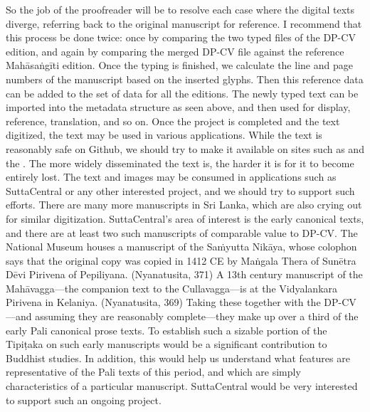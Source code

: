 {}So the job of the proofreader will be to resolve each case where the digital texts diverge, referring back to the original manuscript for reference.\markdownRendererInterblockSeparator
{}I recommend that this process be done twice: once by comparing the two typed files of the DP-CV edition, and again by comparing the merged DP-CV file against the reference Mahāsaṅgīti edition.\markdownRendererInterblockSeparator
{}Once the typing is finished, we calculate the line and page numbers of the manuscript based on the inserted glyphs. Then this reference data can be added to the set of data for all the editions. The newly typed text can be imported into the metadata structure as seen above, and then used for display, reference, translation, and so on.\markdownRendererInterblockSeparator
{}\markdownRendererInterblockSeparator
{}Once the project is completed and the text digitized, the text may be used in various applications. While the text is reasonably safe on Github, we should try to make it available on sites such as  and the . The more widely disseminated the text is, the harder it is for it to become entirely lost.\markdownRendererInterblockSeparator
{}The text and images may be consumed in applications such as SuttaCentral or any other interested project, and we should try to support such efforts.\markdownRendererInterblockSeparator
{}There are many more manuscripts in Sri Lanka, which are also crying out for similar digitization. SuttaCentral’s area of interest is the early canonical texts, and there are at least two such manuscripts of comparable value to DP-CV.\markdownRendererInterblockSeparator
{}\markdownRendererUlBegin
\markdownRendererUlItem The National Museum houses a manuscript of the Saṁyutta Nikāya, whose colophon says that the original copy was copied in 1412 CE by Maṅgala Thera of Sunētra Dēvi Pirivena of Pepiliyana. (Nyanatusita, 371)\markdownRendererUlItemEnd 
\markdownRendererUlItem A 13th century manuscript of the Mahāvagga—the companion text to the Cullavagga—is at the Vidyalankara Pirivena in Kelaniya. (Nyanatusita, 369)\markdownRendererUlItemEnd 
\markdownRendererUlEnd \markdownRendererInterblockSeparator
{}Taking these together with the DP-CV—and assuming they are reasonably complete—they make up over a third of the early Pali canonical prose texts. To establish such a sizable portion of the Tipiṭaka on such early manuscripts would be a significant contribution to Buddhist studies. In addition, this would help us understand what features are representative of the Pali texts of this period, and which are simply characteristics of a particular manuscript. SuttaCentral would be very interested to support such an ongoing project.\markdownRendererInterblockSeparator
